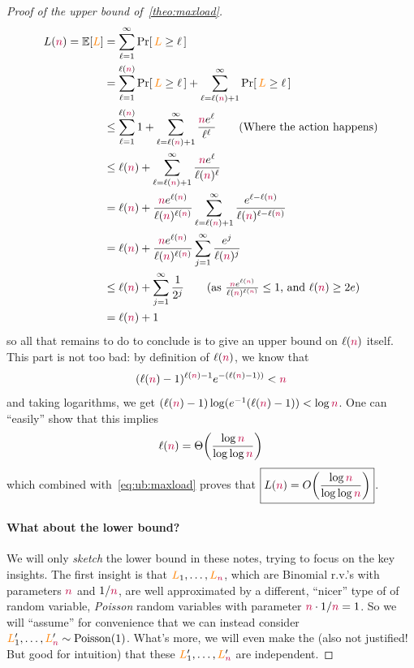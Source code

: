 \begin{proof}[Proof of the upper bound of~\cref{theo:maxload}]
\begin{align}
    L(\nbins) = \expect{\orange{L}} 
    &= \sum_{\ell=1}^\infty \probaOf{\orange{L} \geq \ell} \notag\\
    &= \sum_{\ell=1}^{\ell(\nbins)} \probaOf{\orange{L} \geq \ell} + \sum_{\ell=\ell(\nbins)+1}^\infty \probaOf{\orange{L} \geq \ell} \notag\\
    &\leq \sum_{\ell=1}^{\ell(\nbins)} 1 + \sum_{\ell=\ell(\nbins)+1}^\infty \frac{\nbins e^\ell}{\ell^\ell} \tag{Where the action happens} \notag\\
    &\leq \ell(\nbins) + \sum_{\ell=\ell(\nbins)+1}^\infty \frac{\nbins e^\ell}{\ell(\nbins)^\ell} \notag\\
    &= \ell(\nbins) + \frac{\nbins e^{\ell(\nbins)}}{\ell(\nbins)^{\ell(\nbins)}}\sum_{\ell=\ell(\nbins)+1}^\infty \frac{e^{\ell-\ell(\nbins)}}{\ell(\nbins)^{\ell-\ell(\nbins)}} \notag\\
    &= \ell(\nbins) + \frac{\nbins e^{\ell(\nbins)}}{\ell(\nbins)^{\ell(\nbins)}}\sum_{j=1}^\infty \frac{e^j}{\ell(\nbins)^{j}} \notag\\
    &\leq \ell(\nbins) + \sum_{j=1}^\infty \frac{1}{2^{j}} \tag{as $\frac{\nbins e^{\ell(\nbins)}}{\ell(\nbins)^{\ell(\nbins)}} \leq 1$, and $\ell(\nbins)\geq 2e$} \notag\\
    &= \ell(\nbins) + 1 \label{eq:ub:maxload}
\end{align}
so all that remains to do to conclude is to give an upper bound on $\ell(\textcolor{purple}{n})$ itself. This part is not too bad: by definition of $\ell(\textcolor{purple}{n})$, we know that
\[
    (\ell(\textcolor{purple}{n})-1)^{\ell(\textcolor{purple}{n})-1}e^{-(\ell(\textcolor{purple}{n})-1))} < \textcolor{purple}{n}
\]
and taking logarithms, we get
$
(\ell(\textcolor{purple}{n})-1)\log (e^{-1}(\ell(\textcolor{purple}{n})-1)) < \log \textcolor{purple}{n}
$. One can ``easily'' show that this implies
\[
\ell(\nbins) = \bigTheta{\frac{\log\nbins}{\log\log\nbins}}
\]
which combined with~\eqref{eq:ub:maxload} proves that
$
\boxed{L(\nbins) = \bigO{\frac{\log\nbins}{\log\log\nbins}}}
$.

\paragraph{What about the lower bound?} We will only \emph{sketch} the lower bound in these notes, trying to focus on the key insights. The first insight is that $\textcolor{orange}{L}_1, \dots, \textcolor{orange}{L}_{\textcolor{purple}{n}}$, which are Binomial r.v.'s with parameters $\textcolor{purple}{n}$ and $1/\textcolor{purple}{n}$, are well approximated by a different, ``nicer'' type of of random variable, \emph{Poisson} random variables with parameter $\textcolor{purple}{n}\cdot 1/\textcolor{purple}{n}=1$.  So we will ``assume'' for convenience that we can instead consider $\orange{L}'_1, \dots, \orange{L}'_{\nbins} \sim \poisson{1}$. What's more, we will even make the (also not justified! But good for intuition) that these $\textcolor{orange}{L}'_1, \dots, \textcolor{orange}{L}'_{\textcolor{purple}{n}}$ are independent.


\end{proof}

